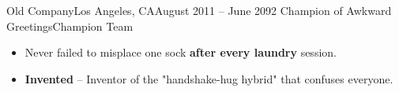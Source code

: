      \resumeSubheadingWork
      {Old Company}{\hspace{-6em}Los Angeles, CA}{August 2011 -- June 2092}
      {Champion of Awkward Greetings}{Champion Team}
      \begin{itemize}[label=\textbf{$\bullet$}]
        \setlength{\itemsep}{-0.15em} %
        \item{Never failed to misplace one sock \textbf{after every laundry} session.}
        \item{\textbf{Invented} – Inventor of the "handshake-hug hybrid" that confuses everyone.}
      \end{itemize}

  \resumeSubHeadingListEnd
